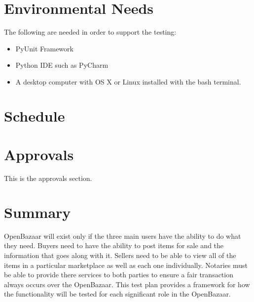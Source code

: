 \documentclass{article}
\begin{document}
\section*{Environmental Needs}
The following are needed in order to support the testing:
\newline
\begin{itemize}
 \item
PyUnit Framework
 \item
Python IDE such as PyCharm
 \item
A desktop computer with OS X or Linux installed with the bash terminal.
\end{itemize}

\section*{Schedule}


\section*{Approvals}
This is the approvals section.

\section*{Summary}
OpenBazaar will exist only if the three main users have the ability to do what they need.
Buyers need to have the ability to post items for sale and the information that goes along with it.
Sellers need to be able to view all of the items in a particular marketplace as well as each one individually.
Notaries must be able to provide there services to both parties to ensure a fair transaction always occurs over the OpenBazaar.
This test plan provides a framework for how the functionality will be tested for each significant role in the OpenBazaar.
\end{document}
